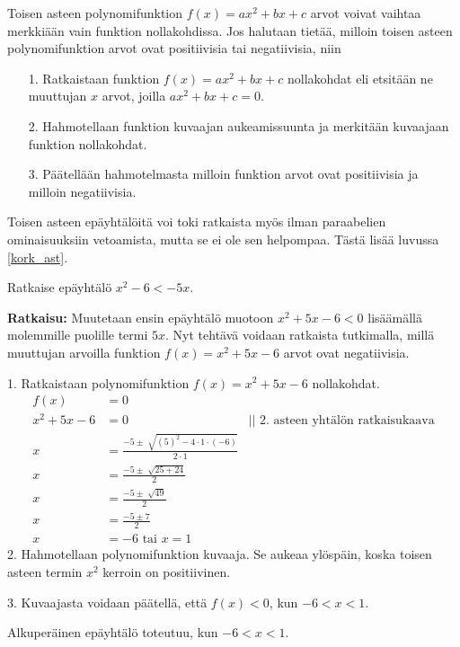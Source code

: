 Toisen asteen polynomifunktion $f(x)=ax^2+bx+c$ arvot voivat vaihtaa merkkiään vain funktion nollakohdissa. Jos halutaan tietää, milloin toisen asteen polynomifunktion arvot ovat positiivisia tai negatiivisia, niin
\begin{itemize}
\item[1.] Ratkaistaan funktion $f(x)=ax^2+bx+c$ nollakohdat eli etsitään ne muuttujan $x$ arvot, joilla $ax^2+bx+c=0$.
\item[2.] Hahmotellaan funktion kuvaajan aukeamissuunta ja merkitään kuvaajaan funktion nollakohdat.
\item[3.] Päätellään hahmotelmasta milloin funktion arvot ovat positiivisia ja milloin negatiivisia.
\end{itemize} 

Toisen asteen epäyhtälöitä voi toki ratkaista myös ilman paraabelien ominaisuuksiin vetoamista, mutta se ei ole sen helpompaa. Tästä lisää luvussa \ref{kork_ast}.

\begin{esimerkki} 
Ratkaise epäyhtälö $x^2-6<-5x$.
 
\textbf{Ratkaisu:}
Muutetaan ensin epäyhtälö muotoon $x^2+5x-6<0$ lisäämällä molemmille puolille termi $5x$. Nyt tehtävä voidaan ratkaista tutkimalla, millä muuttujan arvoilla funktion $f(x)=x^2+5x-6$ arvot ovat negatiivisia.
 
1. Ratkaistaan polynomifunktion $f(x)=x^2+5x-6$ nollakohdat.
\begin{align*}
f(x)&=0 & \\
x^2+5x-6&=0 \ \  \ \ \ & || \text{ 2. asteen yhtälön ratkaisukaava} \\ 
x&=\frac{-5 \pm \sqrt[]{(5)^2-4 \cdot 1 \cdot(-6)}}{2 \cdot 1} & \\
x&=\frac{-5 \pm \sqrt[]{25+24}}{2} & \\
x&=\frac{-5 \pm \sqrt[]{49}}{2} & \\
x&=\frac{-5 \pm 7}{2} & \\
x&=-6 \text{ tai } x=1 &
\end{align*}
2. Hahmotellaan polynomifunktion kuvaaja. Se aukeaa ylöspäin, koska toisen
asteen termin $x^2$ kerroin on positiivinen.
 
\begin{lukusuora}{-2.5}{2.5}{5}
\end{lukusuora}
 
3.  Kuvaajasta voidaan päätellä, että $f(x)<0$, kun $-6 < x < 1$.
 
\begin{esimvast} 
Alkuperäinen epäyhtälö toteutuu, kun $-6 < x <1$.  
\end{esimvast}
\end{esimerkki}

